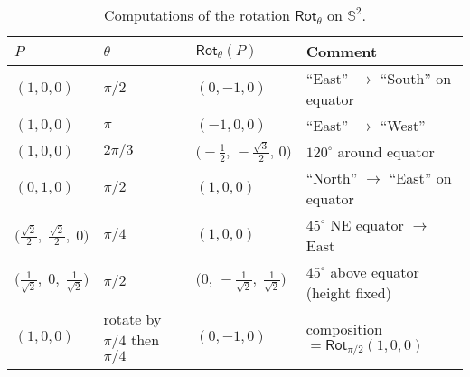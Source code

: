 \documentclass[11pt,openany]{article}
\begin{document}
\begin{table}[h]
	\centering{}
	\begin{tabular}{llll}
		\toprule
		$P$ & $\theta$ & $\mathsf{Rot}_\theta(P)$ & Comment \\
		\midrule
		$(1,0,0)$ & $\pi/2$ & $(0,-1,0)$ & ``East'' $\to$ ``South'' on equator \\
		$(1,0,0)$ & $\pi$ & $(-1,0,0)$ & ``East'' $\to$ ``West'' \\
		$(1,0,0)$ & $2\pi/3$ & $\bigl(-\tfrac12,\,-\tfrac{\sqrt3}{2},\,0\bigr)$ & $120^\circ$ around equator \\
		$(0,1,0)$ & $\pi/2$ & $(1,0,0)$ & ``North'' $\to$ ``East'' on equator \\
		$\bigl(\tfrac{\sqrt2}{2},\;\tfrac{\sqrt2}{2},\;0\bigr)$ & $\pi/4$ & $(1,0,0)$ & $45^\circ$ NE equator $\to$ East \\
		$\bigl(\tfrac1{\sqrt2},\;0,\;\tfrac1{\sqrt2}\bigr)$ & $\pi/2$ & $\bigl(0,\,-\tfrac1{\sqrt2},\;\tfrac1{\sqrt2}\bigr)$ & $45^\circ$ above equator (height fixed) \\
		$(1,0,0)$ & rotate by $\pi/4$ then $\pi/4$ & $(0,-1,0)$ & composition $=\mathsf{Rot}_{\pi/2}(1,0,0)$ \\
		\bottomrule
	\end{tabular}
	\caption{Computations of the rotation $\mathsf{Rot}_\theta$ on $\mathbb{S}^2$.}
\end{table}
\end{document}
